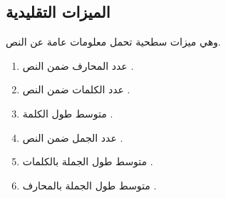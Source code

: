 \subsection{الميزات التقليدية }
وهي ميزات سطحية تحمل معلومات عامة عن النص.
\begin{enumerate}
	\item 
	عدد المحارف ضمن النص .
	\item 
	عدد الكلمات ضمن النص .
	\item 
	متوسط طول الكلمة .
	\item 
	عدد الجمل ضمن النص .
	\item 
	متوسط طول الجملة بالكلمات .
	\item 
	متوسط طول الجملة بالمحارف .
\end{enumerate}




